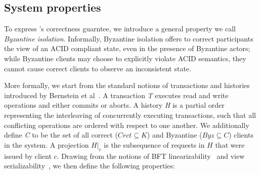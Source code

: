 \subsection{System properties}
To express \sys's correctness guarntee, we introduce a general property we call  {\em Byzantine isolation}. Informally, Byzantine isolation offers to correct participants the view of an ACID compliant state, even in the presence of Byzantine actors;  while Byzantine clients may choose to explicitly violate ACID semantics, they cannot cause correct clients to observe an inconsistent state.  


More formally, we start from  the standard notions of transactions and histories introduced by Bernstein et al~\cite{bernstein1987concurrency}. A transaction \textit{T} executes read and write operations and either commits or aborts. A history \textit{H} is a partial order representing the interleaving of concurrently executing transactions, such that all conflicting operations are ordered with respect to one another. We additionally define \textit{C} to be the set of all correct ($Crct \subseteq K$) and Byzantine ($Byz \subseteq C$) clients in the system.
A projection $H|_{c}$ is the subsequence of requests in $H$ that were issued by client $c$. Drawing from the notions of BFT linearizability~\cite{liskov2006tolerating} and view serializability~\cite{bernstein1987concurrency}, we then define the following properties:


